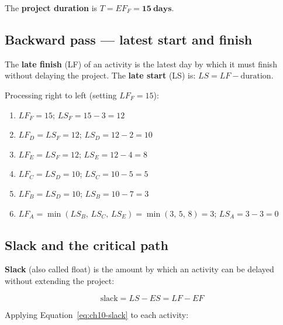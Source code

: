 The \textbf{project duration} is
$T = EF_F = \mathbf{15\ \text{days}}$.

\subsection{Backward pass — latest start and finish}

The \textbf{late finish} (LF) of an activity is the
latest day by which it must finish without delaying the project.
The \textbf{late start} (LS) is:
$LS = LF - \text{duration}$.

Processing right to left (setting $LF_F = 15$):

\begin{enumerate}
  \item[(F)] $LF_F = 15$; \quad $LS_F = 15 - 3 = 12$
  \item[(D)] $LF_D = LS_F = 12$; \quad $LS_D = 12 - 2 = 10$
  \item[(E)] $LF_E = LS_F = 12$; \quad $LS_E = 12 - 4 = 8$
  \item[(C)] $LF_C = LS_D = 10$; \quad $LS_C = 10 - 5 = 5$
  \item[(B)] $LF_B = LS_D = 10$; \quad $LS_B = 10 - 7 = 3$
  \item[(A)] $LF_A = \min(LS_B,\, LS_C,\, LS_E) = \min(3,\, 5,\, 8) = 3$;
             \quad $LS_A = 3 - 3 = 0$
\end{enumerate}

\subsection{Slack and the critical path}

\textbf{Slack} (also called float) is the amount by which
an activity can be delayed without extending the project:

\begin{equation}
  \text{slack} = LS - ES = LF - EF
  \label{eq:ch10-slack}
\end{equation}

Applying Equation~\ref{eq:ch10-slack} to each activity:

